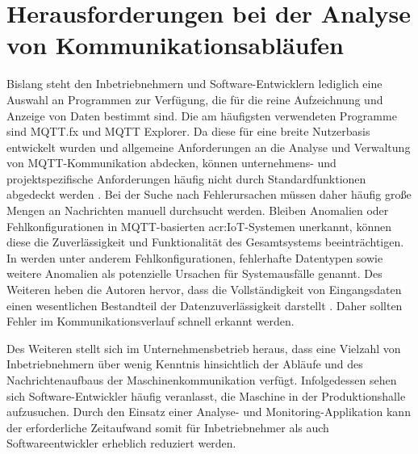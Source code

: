 \section{Herausforderungen bei der Analyse von Kommunikationsabläufen}
Bislang steht den Inbetriebnehmern und Software-Entwicklern lediglich eine Auswahl an Programmen zur Verfügung, die für die reine Aufzeichnung und Anzeige von Daten bestimmt sind. Die am häufigsten verwendeten Programme sind MQTT.fx und MQTT Explorer. Da diese für eine breite Nutzerbasis entwickelt wurden und allgemeine Anforderungen an die Analyse und Verwaltung von MQTT-Kommunikation abdecken, können unternehmens- und projektspezifische Anforderungen häufig nicht durch Standardfunktionen abgedeckt werden \autocite[13--14]{brooksNoSilverBullet1987}. Bei der Suche nach Fehlerursachen müssen daher häufig große Mengen an Nachrichten manuell durchsucht werden. Bleiben Anomalien oder Fehlkonfigurationen in MQTT-basierten \gls{acr:IoT}-Systemen unerkannt, können diese die Zuverlässigkeit und Funktionalität des Gesamtsystems beeinträchtigen. In \autocite[3]{Imran} werden unter anderem Fehlkonfigurationen, fehlerhafte Datentypen sowie weitere Anomalien als potenzielle Ursachen für Systemausfälle genannt. Des Weiteren heben die Autoren hervor, dass die Vollständigkeit von Eingangsdaten einen wesentlichen Bestandteil der Datenzuverlässigkeit darstellt \autocite[3]{Imran}. Daher sollten Fehler im Kommunikationsverlauf schnell erkannt werden.

Des Weiteren stellt sich im Unternehmensbetrieb heraus, dass eine Vielzahl von Inbetriebnehmern über wenig Kenntnis hinsichtlich der Abläufe und des Nachrichtenaufbaus der Maschinenkommunikation verfügt. Infolgedessen sehen sich Software-Entwickler häufig veranlasst, die Maschine in der Produktionshalle aufzusuchen. Durch den Einsatz einer Analyse- und Monitoring-Applikation kann der erforderliche Zeitaufwand somit für Inbetriebnehmer als auch Softwareentwickler erheblich reduziert werden.